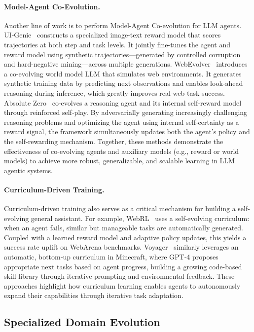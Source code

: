\paragraph{Model-Agent Co‑Evolution.} Another line of work is to perform Model-Agent Co‑evolution for LLM agents. 
UI‑Genie~\citep{xiao2025ui} constructs a specialized image-text reward model that scores trajectories at both step and task levels. It jointly fine-tunes the agent and reward model using synthetic trajectories—generated by controlled corruption and hard-negative mining—across multiple generations.
WebEvolver~\citep{fang2025webevolver} introduces a co-evolving world model LLM that simulates web environments. It generates synthetic training data by predicting next observations and enables look-ahead reasoning during inference, which greatly improves real-web task success. 
Absolute Zero~\citep{zhao2025absolute} co‑evolves a reasoning agent and its internal self‑reward model through reinforced self‑play. By adversarially generating increasingly challenging reasoning problems and optimizing the agent using internal self‑certainty as a reward signal, the framework simultaneously updates both the agent's policy and the self-rewarding mechanism.
Together, these methods demonstrate the effectiveness of co-evolving agents and auxiliary models (e.g., reward or world models) to achieve more robust, generalizable, and scalable learning in LLM agentic systems.

\paragraph{Curriculum-Driven Training.} 
Curriculum-driven training also serves as a critical mechanism for building a self-evolving general assistant. 
For example, WebRL~\citep{qi2024webrl} uses a self-evolving curriculum: when an agent fails, similar but manageable tasks are automatically generated. Coupled with a learned reward model and adaptive policy updates, this yields a success rate uplift on WebArena benchmarks. 
Voyager~\citep{wang2023voyager} similarly leverages an automatic, bottom‑up curriculum in Minecraft, where GPT‑4 proposes appropriate next tasks based on agent progress, building a growing code-based skill library through iterative prompting and environmental feedback. 
These approaches highlight how curriculum learning enables agents to autonomously expand their capabilities through iterative task adaptation.


\subsection{Specialized Domain Evolution}

